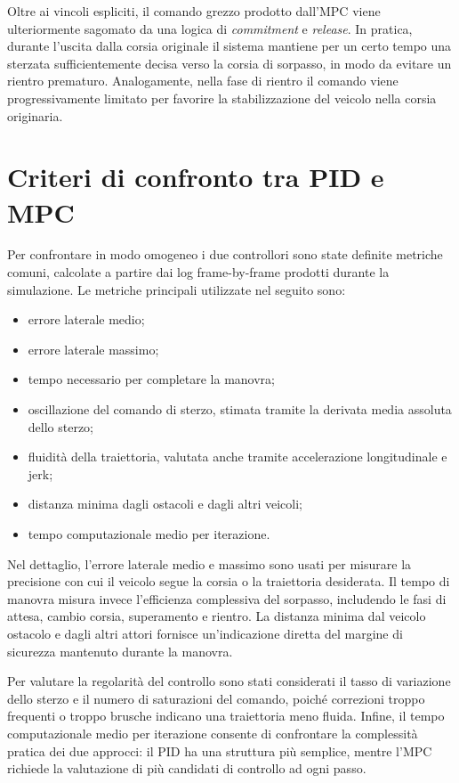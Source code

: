 Oltre ai vincoli espliciti, il comando grezzo prodotto dall'MPC viene ulteriormente sagomato da una logica di \textit{commitment} e \textit{release}. In pratica, durante l'uscita dalla corsia originale il sistema mantiene per un certo tempo una sterzata sufficientemente decisa verso la corsia di sorpasso, in modo da evitare un rientro prematuro. Analogamente, nella fase di rientro il comando viene progressivamente limitato per favorire la stabilizzazione del veicolo nella corsia originaria.

\section{Criteri di confronto tra PID e MPC}

Per confrontare in modo omogeneo i due controllori sono state definite metriche comuni, calcolate a partire dai log frame-by-frame prodotti durante la simulazione. Le metriche principali utilizzate nel seguito sono:

\begin{itemize}
    \item errore laterale medio;
    \item errore laterale massimo;
    \item tempo necessario per completare la manovra;
    \item oscillazione del comando di sterzo, stimata tramite la derivata media assoluta dello sterzo;
    \item fluidità della traiettoria, valutata anche tramite accelerazione longitudinale e jerk;
    \item distanza minima dagli ostacoli e dagli altri veicoli;
    \item tempo computazionale medio per iterazione.
\end{itemize}

Nel dettaglio, l'errore laterale medio e massimo sono usati per misurare la precisione con cui il veicolo segue la corsia o la traiettoria desiderata. Il tempo di manovra misura invece l'efficienza complessiva del sorpasso, includendo le fasi di attesa, cambio corsia, superamento e rientro. La distanza minima dal veicolo ostacolo e dagli altri attori fornisce un'indicazione diretta del margine di sicurezza mantenuto durante la manovra.

Per valutare la regolarità del controllo sono stati considerati il tasso di variazione dello sterzo e il numero di saturazioni del comando, poiché correzioni troppo frequenti o troppo brusche indicano una traiettoria meno fluida. Infine, il tempo computazionale medio per iterazione consente di confrontare la complessità pratica dei due approcci: il PID ha una struttura più semplice, mentre l'MPC richiede la valutazione di più candidati di controllo ad ogni passo.

